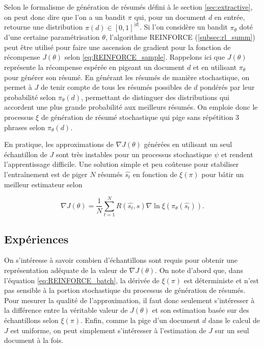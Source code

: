Selon le formalisme de génération de résumés défini à le section \ref{sec:extractive},
on peut donc dire que l'on a un bandit $\pi$ qui, pour un document $d$ en entrée, retourne
une distribution $\pi(d) \in [0,1]^{|d|}$.
Si l'on considère un bandit $\pi_\theta$ doté d'une certaine paramétrisation $\theta$,
l'algorithme REINFORCE (\ref{subsec:rl_summ}) peut être utilisé pour faire une ascension
de gradient pour la fonction de récompense $J(\theta)$ selon \eqref{eq:REINFORCE_sample}.
Rappelons ici que $J(\theta)$ représente la récompense espérée en pigeant un document $d$
et en utilisant $\pi_\theta$ pour générer son résumé.
En générant les résumés de manière stochastique, on permet à $J$ de tenir compte
de tous les résumés possibles de $d$ pondérés par leur probabilité selon $\pi_\theta(d)$,
permettant de distinguer des distributions qui accordent une plus grande probabilité aux
meilleurs résumés.
On emploie donc le processus $\xi$ de génération de résumé stochastique
qui pige sans répétition 3 phrases selon $\pi_\theta(d)$.

En pratique, les approximations de $\nabla J(\theta)$ générées en utilisant un seul
échantillon de $J$ sont très instables pour un processus stochastique $\psi$
et rendent l'apprentissage difficile.
Une solution simple et peu coûteuse pour stabiliser l'entraînement est de piger $N$
résumés $\hat{s_t}$ en fonction de $\xi(\pi)$ pour bâtir un meilleur estimateur selon

\begin{equation}
    \nabla J(\theta) = \frac{1}{N} \sum_{t=1}^N R(\hat{s_t}, s) \nabla \ln \xi\left( \pi_\theta(\hat{s_t})\right).
    \label{eq:REINFORCE_batch}
\end{equation}

\subsection{Expériences}

On s'intéresse à savoir combien d'échantillons sont requis pour obtenir une représentation 
adéquate de la valeur de $\nabla J(\theta)$.
On note d'abord que, dans l'équation \eqref{eq:REINFORCE_batch}, la dérivée de $\xi(\pi)$ est déterministe
et n'est pas sensible à la portion stochastique du processus de génération de résumés.
Pour mesurer la qualité de l'approximation, il faut donc seulement s'intéresser
à la différence entre la véritable valeur de $J(\theta)$ et son estimation 
basée sur des échantillons selon $\xi(\pi)$.
Enfin, comme la pige d'un document $d$ dans le calcul de $J$ est uniforme, on
peut simplement s'intéresser à l'estimation de $J$ sur un seul document à la fois.


